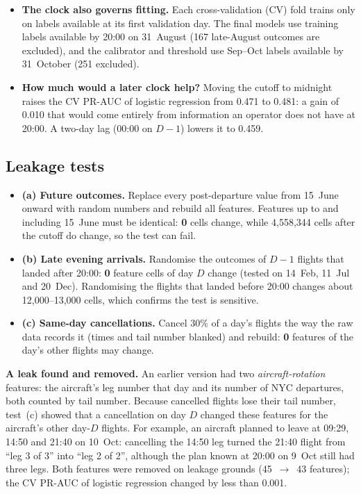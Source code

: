 \documentclass[conference]{IEEEtran}
\begin{document}
\begin{itemize}
\item \textbf{The clock also governs fitting.} Each cross-validation (CV) fold trains only on labels available at its first validation day. The final models use training labels available by 20:00 on 31~August (167 late-August outcomes are excluded), and the calibrator and threshold use Sep--Oct labels available by 31~October (251 excluded).
\item \textbf{How much would a later clock help?} Moving the cutoff to midnight raises the CV PR-AUC of logistic regression from 0.471 to 0.481: a gain of 0.010 that would come entirely from information an operator does not have at 20:00. A two-day lag (00:00 on $D-1$) lowers it to 0.459.
\end{itemize}

\subsection{Leakage tests}\label{sec:leak}
\begin{itemize}
\item \textbf{(a) Future outcomes.} Replace every post-departure value from 15~June onward with random numbers and rebuild all features. Features up to and including 15~June must be identical: \textbf{0} cells change, while 4{,}558{,}344 cells after the cutoff do change, so the test can fail.
\item \textbf{(b) Late evening arrivals.} Randomise the outcomes of $D-1$ flights that landed after 20:00: \textbf{0} feature cells of day $D$ change (tested on 14~Feb, 11~Jul and 20~Dec). Randomising the flights that landed before 20:00 changes about 12{,}000--13{,}000 cells, which confirms the test is sensitive.
\item \textbf{(c) Same-day cancellations.} Cancel 30\% of a day's flights the way the raw data records it (times and tail number blanked) and rebuild: \textbf{0} features of the day's other flights may change.
\end{itemize}

\textbf{A leak found and removed.} An earlier version had two \emph{aircraft-rotation} features: the aircraft's leg number that day and its number of NYC departures, both counted by tail number. Because cancelled flights lose their tail number, test~(c) showed that a cancellation on day $D$ changed these features for the aircraft's other day-$D$ flights. For example, an aircraft planned to leave at 09:29, 14:50 and 21:40 on 10~Oct: cancelling the 14:50 leg turned the 21:40 flight from ``leg 3 of 3'' into ``leg 2 of 2'', although the plan known at 20:00 on 9~Oct still had three legs. Both features were removed on leakage grounds (45~$\to$~43 features); the CV PR-AUC of logistic regression changed by less than 0.001.
\end{document}
